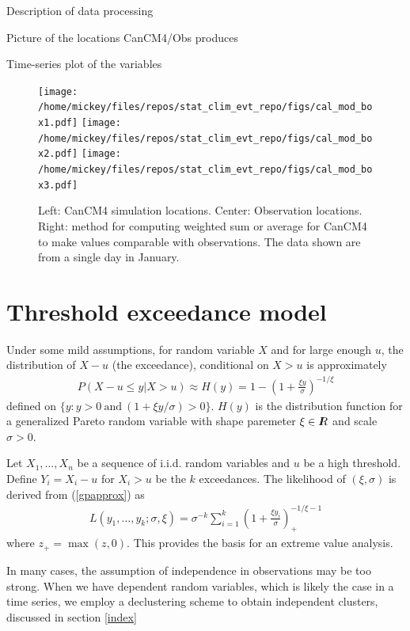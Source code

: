 \documentclass[12pt]{article}
\newcommand{\R}{I\hspace{-4.4pt}R}
\newcommand{\R}{I\hspace{-4.4pt}R}
\begin{document}
Description of data processing
\bigskip

Picture of the locations CanCM4/Obs produces
\bigskip

Time-series plot of the variables
\bigskip

\begin{figure}
\begin{center}
\texttt{[image: /home/mickey/files/repos/stat\_clim\_evt\_repo/figs/cal\_mod\_box1.pdf]}
\texttt{[image: /home/mickey/files/repos/stat\_clim\_evt\_repo/figs/cal\_mod\_box2.pdf]}
\texttt{[image: /home/mickey/files/repos/stat\_clim\_evt\_repo/figs/cal\_mod\_box3.pdf]}
\end{center}
\caption{Left: CanCM4 simulation locations. Center: Observation locations. Right: method for computing weighted sum or average for CanCM4 to make values comparable with observations. The data shown are from a single day in January.}
\end{figure}
 
\section{Threshold exceedance model}
\label{thresh}

Under some mild assumptions, for random variable $X$ and for large enough $u$, the distribution of $X-u$ (the exceedance), conditional on $X>u$ is approximately
\begin{align}
P(X-u\leq y|X>u) \approx H(y) = 1 - \left(1+\frac{\xi y}{\sigma}\right)^{-1/\xi} \label{gpapprox}
\end{align}
defined on $\{y:y>0~\mathrm{and}~(1+\xi y/\sigma) >0\}$. $H(y)$ is the distribution function for a generalized Pareto random variable with shape paremeter $\xi\in\R$ and scale $\sigma>0$.

Let $X_1,\ldots,X_n$ be a sequence of i.i.d. random variables and $u$ be a high threshold. Define $Y_i=X_i-u$ for $X_i>u$ be the $k$ exceedances. The likelihood of $(\xi,\sigma)$ is derived from (\ref{gpapprox}) as
\begin{align}
L(y_1,\ldots,y_k;\sigma,\xi)=\sigma^{-k}\sum_{i=1}^k\left(1+\frac{\xi y_i}{\sigma}\right)_+^{-1/\xi-1}
\end{align}
where $z_+=\max(z,0)$. This provides the basis for an extreme value analysis.

In many cases, the assumption of independence in observations may be too strong. When we have dependent random variables, which is likely the case in a time series, we employ a declustering scheme to obtain independent clusters, discussed in section \ref{index}
\bigskip
\end{document}
